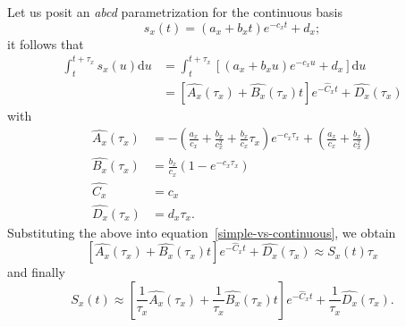 \documentclass{article}
\begin{document}
Let us posit an \textit{abcd} parametrization for the continuous basis
\begin{equation}
s_x(t) = (a_x + b_x t)e^{-c_x t} + d_x;
\end{equation}
it follows that
\begin{equation}
\begin{split}
\int_t^{t+\tau_x} s_x(u) \mathrm{d}u &= \int_t^{t+\tau_x} \left[ (a_x + b_x u)e^{-c_x u} + d_x \right] \mathrm{d}u \\
                                     &= \left[\hat{A_x}(\tau_x) + \hat{B_x}(\tau_x) t\right] e^{-\hat{C}_x  t} + \hat{D_x}(\tau_x)
\end{split}
\end{equation}
with
\begin{equation}
\label{eq:integratedCoef}
\begin{split}
\hat{A_x}(\tau_x)&=-\left(\frac{a_x}{c_x}+ \frac{b_x}{c_x^{2}}+\frac{b_x}{c_x}\tau_x \right)e^{-c_x \tau_x}+\left(\frac{a_x}{c_x}+ \frac{b_x}{c_x^{2}}\right) \\
\hat{B_x}(\tau_x)&=\frac{b_x}{c_x}\left(1-e^{-c_x \tau_x}\right) \\
\hat{C_x}&=c_x \\
\hat{D_x}(\tau_x)&=d_x \tau_x.
\end{split}
\end{equation}
Substituting the above into equation~\ref{simple-vs-continuous}, we obtain
\begin{equation}
\left[\hat{A_x}(\tau_x) + \hat{B_x}(\tau_x) t\right] e^{-\hat{C}_x t} + \hat{D_x}(\tau_x) \approx S_x(t) \tau_x 
\end{equation}
and finally
\begin{equation}
S_x(t) \approx \left[\frac{1}{\tau_x}\hat{A_x}(\tau_x) + \frac{1}{\tau_x}\hat{B_x}(\tau_x) t\right] e^{-\hat{C}_x t} + \frac{1}{\tau_x}\hat{D_x}(\tau_x).
\end{equation}
\end{document}
